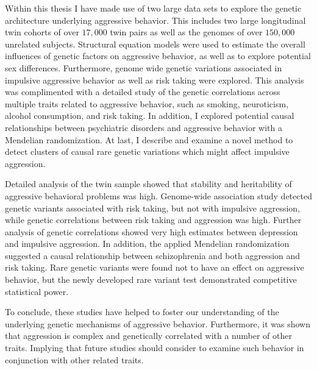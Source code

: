 \documentclass[header.tex]{subfiles}
\begin{document}
Within this thesis I have made use of two large data sets to explore the genetic architecture underlying aggressive behavior.
This includes two large longitudinal twin cohorts of over $17,000$ twin pairs as well as the genomes of over $150,000$ unrelated subjects. 
Structural equation models were used to estimate the overall influences of genetic factors on aggressive behavior, as well as to explore potential sex differences.
Furthermore, genome wide genetic variations associated in impulsive aggressive behavior as well as risk taking were explored.
This analysis was complimented with a detailed study of the genetic correlations across multiple traits related to aggressive behavior, such as smoking, neuroticism, alcohol consumption, and risk taking.    
In addition, I explored potential causal relationships between psychiatric disorders and aggressive behavior with a Mendelian randomization. 
At last, I describe and examine a novel method to detect clusters of causal rare genetic variations which might affect impulsive aggression. 

Detailed analysis of the twin sample showed that stability and heritability of aggressive behavioral problems was high.
Genome-wide association study detected genetic variants associated with risk taking, but not with impulsive aggression, while genetic correlations between risk taking and aggression was high.
Further analysis of genetic correlations showed very high estimates between depression and impulsive aggression.
In addition, the applied Mendelian randomization suggested a causal relationship between schizophrenia and both aggression and risk taking.
Rare genetic variants were found not to have an effect on aggressive behavior, but the newly developed rare variant test demonstrated competitive statistical power.

To conclude, these studies have helped to foster our understanding of the underlying genetic mechanisms of aggressive behavior.
Furthermore, it was shown that aggression is complex and genetically correlated with a number of other traits.
Implying that future studies should consider to examine such behavior in conjunction with other related traits.     
\end{document}
